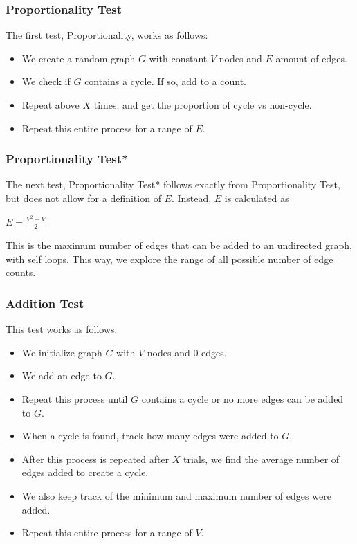 \documentclass[12pt]{article}
\begin{document}
\subsubsection*{Proportionality Test}
The first test, Proportionality, works as follows:

\begin{itemize}
    \item We create a random graph $G$ with constant $V$ nodes and $E$ amount of edges.
    \item We check if $G$ contains a cycle. If so, add to a count.
    \item Repeat above $X$ times, and get the proportion of cycle vs non-cycle.
    \item Repeat this entire process for a range of $E$.
\end{itemize}

\subsubsection*{Proportionality Test*}
The next test, Proportionality Test* follows exactly from Proportionality Test, but does not allow for a definition of $E$. Instead, $E$ is calculated as

\begin{center}
    $E = \frac{V^2 + V}{2}$
\end{center}

This is the maximum number of edges that can be added to an undirected graph, with self loops. This way, we explore the range of all possible number of edge counts.

\subsubsection*{Addition Test}

This test works as follows.

\begin{itemize}
    \item We initialize graph $G$ with $V$ nodes and 0 edges.
    \item We add an edge to $G$.
    \item Repeat this process until $G$ contains a cycle or no more edges can be added to $G$.
    \item When a cycle is found, track how many edges were added to $G$.
    \item After this process is repeated after $X$ trials, we find the average number of edges added to create a cycle.
    \item We also keep track of the minimum and maximum number of edges were added.
    \item Repeat this entire process for a range of $V$.
\end{itemize}
\end{document}
